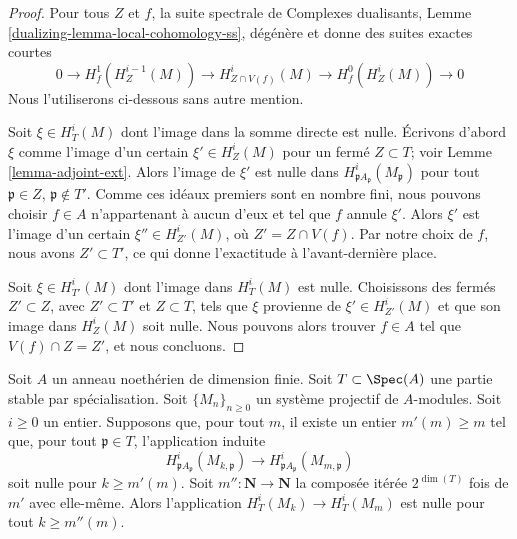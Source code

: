 \begin{proof}
Pour tous $Z$ et $f$, la suite spectrale de
Complexes dualisants, Lemme \ref{dualizing-lemma-local-cohomology-ss},
dégénère et donne des suites exactes courtes
$$
0 \to H^1_f(H^{i - 1}_Z(M)) \to
H^i_{Z \cap V(f)}(M) \to H^0_f(H^i_Z(M)) \to 0
$$
Nous l'utiliserons ci-dessous sans autre mention.

\medskip\noindent
Soit $\xi \in H^i_T(M)$ dont l'image dans la somme directe est nulle.
Écrivons d'abord $\xi$ comme l'image d'un certain $\xi' \in H^i_Z(M)$
pour un fermé $Z \subset T$; voir Lemme \ref{lemma-adjoint-ext}.
Alors l'image de $\xi'$ est nulle dans $H^i_{\mathfrak p A_\mathfrak p}(M_\mathfrak p)$
pour tout $\mathfrak p \in Z$, $\mathfrak p \not \in T'$.
Comme ces idéaux premiers sont en nombre fini,
nous pouvons choisir $f \in A$ n'appartenant à aucun d'eux
et tel que $f$ annule $\xi'$. Alors $\xi'$
est l'image d'un certain $\xi'' \in H^i_{Z'}(M)$,
où $Z' = Z \cap V(f)$. Par notre choix de $f$, nous avons
$Z' \subset T'$, ce qui donne l'exactitude à l'avant-dernière place.

\medskip\noindent
Soit $\xi \in H^i_{T'}(M)$ dont l'image dans $H^i_T(M)$ est nulle.
Choisissons des fermés $Z' \subset Z$, avec $Z' \subset T'$
et $Z \subset T$, tels que $\xi$ provienne de $\xi' \in H^i_{Z'}(M)$
et que son image dans $H^i_Z(M)$ soit nulle. Nous pouvons alors trouver $f \in A$
tel que $V(f) \cap Z = Z'$, et nous concluons.
\end{proof}

\begin{lemma}
\label{lemma-zero}
Soit $A$ un anneau noethérien de dimension finie.
Soit $T \subset \Spec(A)$ une partie stable par spécialisation.
Soit $\{M_n\}_{n \geq 0}$ un système projectif de $A$-modules.
Soit $i \geq 0$ un entier. Supposons que, pour tout $m$, il
existe un entier $m'(m) \geq m$ tel que, pour tout
$\mathfrak p \in T$, l'application induite
$$
H^i_{\mathfrak p A_\mathfrak p}(M_{k, \mathfrak p})
\longrightarrow
H^i_{\mathfrak p A_\mathfrak p}(M_{m, \mathfrak p})
$$
soit nulle pour $k \geq m'(m)$. Soit $m'' : \mathbf{N} \to \mathbf{N}$
la composée itérée $2^{\dim(T)}$ fois de $m'$ avec elle-même. Alors l'application
$H^i_T(M_k) \to H^i_T(M_m)$ est nulle pour tout $k \geq m''(m)$.
\end{lemma}

